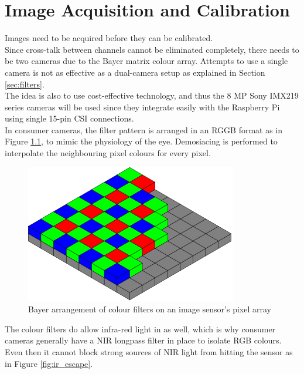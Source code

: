 \chapter{Image Acquisition and Calibration}
\label{image_acq}

Images need to be acquired before they can be calibrated.\\

Since cross-talk between channels cannot be eliminated completely, there needs to be two cameras due to the Bayer matrix colour array. Attempts to use a single camera is not as effective as a dual-camera setup as explained in Section \ref{sec:filters}.\\

The idea is also to use cost-effective technology, and thus the 8 MP Sony IMX219 series cameras will be used since they integrate easily with the Raspberry Pi using single 15-pin CSI connections.\\


In consumer cameras, the filter pattern is arranged in an RGGB format as in Figure \ref{fig:bayer}, to mimic the physiology of the eye. Demosiacing is performed to interpolate the neighbouring pixel colours for every pixel.

\begin{figure}[H]
\centering
\includegraphics[scale=0.35]{images/bayer.png}
\caption{Bayer arrangement of colour filters on an image sensor's pixel array \cite{bayer}}
\label{fig:bayer}
\end{figure}

The colour filters do allow infra-red light in as well, which is why consumer cameras generally have a NIR longpass filter in place to isolate RGB colours. Even then it cannot block strong sources of NIR light from hitting the sensor as in Figure \ref{fig:ir_escape}.

